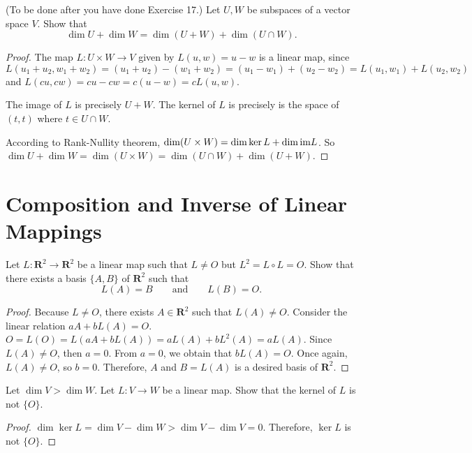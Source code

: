 \begin{exercise}
    (To be done after you have done Exercise 17.) Let $U, W$ be subspaces of a vector space $V$. Show that
    \[
        \boxed{\dim U + \dim W = \dim (U + W) + \dim(U\cap W).}
    \]
\end{exercise}

\begin{proof}
    The map $L: U\times W \to V$ given by $L(u, w) = u - w$ is a linear map, since $L(u_{1} + u_{2}, w_{1} + w_{2}) = (u_{1} + u_{2}) - (w_{1} + w_{2}) = (u_{1} - w_{1}) + (u_{2} - w_{2}) = L(u_{1}, w_{1}) + L(u_{2}, w_{2})$ and $L(cu, cw) = cu - cw = c(u - w) = cL(u, w)$.

    The image of $L$ is precisely $U + W$. The kernel of $L$ is precisely is the space of $(t, t)$ where $t\in U\cap W$.

    According to Rank-Nullity theorem, $\dim (U\times W) = \dim\ker L + \dim\text{im} L$. So $\dim U + \dim W = \dim (U\times W) = \dim (U\cap W) + \dim (U + W)$.
\end{proof}

\section{Composition and Inverse of Linear Mappings}
\setcounter{exercise}{0}

\begin{exercise}
    Let $L: \mathbf{R}^{2} \to \mathbf{R}^{2}$ be a linear map such that $L\ne O$ but $L^{2} = L \circ L = O$. Show that there exists a basis $\{ A, B \}$ of $\mathbf{R}^{2}$ such that
    \[
        L(A) = B \qquad\text{and}\qquad L(B) = O.
    \]
\end{exercise}

\begin{proof}
    Because $L\ne O$, there exists $A\in\mathbf{R}^{2}$ such that $L(A) \ne O$. Consider the linear relation $aA + bL(A) = O$. $O = L(O) = L(aA + bL(A)) = aL(A) + bL^{2}(A) = aL(A)$. Since $L(A) \ne O$, then $a = 0$. From $a = 0$, we obtain that $bL(A) = O$. Once again, $L(A)\ne O$, so $b = 0$. Therefore, $A$ and $B = L(A)$ is a desired basis of $\mathbf{R}^{2}$.
\end{proof}

\begin{exercise}
    Let $\dim V > \dim W$. Let $L: V \to W$ be a linear map. Show that the kernel of $L$ is not $\{ O \}$.
\end{exercise}

\begin{proof}
    $\dim\ker L = \dim V - \dim W > \dim V - \dim V = 0$. Therefore, $\ker L$ is not $\{ O \}$.
\end{proof}

